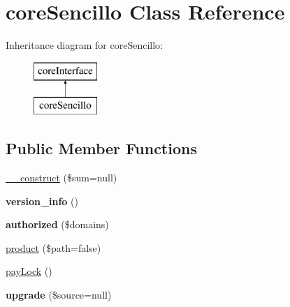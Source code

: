 \hypertarget{classcore_sencillo}{\section{core\-Sencillo Class Reference}
\label{classcore_sencillo}
}
Inheritance diagram for core\-Sencillo\-:\begin{figure}[H]
\begin{center}
\leavevmode
\includegraphics[height=2.000000cm]{classcore_sencillo}
\end{center}
\end{figure}
\subsection*{Public Member Functions}
\begin{DoxyCompactItemize}
\item 
\hyperlink{classcore_sencillo_a4fd5742704d00ae15f527894bcd8cfb9}{\-\_\-\-\_\-construct} (\$sum=null)
\item 
\hypertarget{classcore_sencillo_a7664184e15f00825b54ecf378cd4174f}{{\bfseries version\-\_\-info} ()}\label{classcore_sencillo_a7664184e15f00825b54ecf378cd4174f}

\item 
\hypertarget{classcore_sencillo_a2c7c8f0c4ae866f7c7f9956739d39696}{{\bfseries authorized} (\$domains)}\label{classcore_sencillo_a2c7c8f0c4ae866f7c7f9956739d39696}

\item 
\hyperlink{classcore_sencillo_a62e12d2cf1dbc3c01d867a76d26adf65}{product} (\$path=false)
\item 
\hyperlink{classcore_sencillo_af4cf8181fcda31ba0ce060121795c5dc}{pay\-Lock} ()
\item 
\hypertarget{classcore_sencillo_af357eccac1f8e7e9df4c1491a92bd0f1}{{\bfseries upgrade} (\$source=null)}\label{classcore_sencillo_af357eccac1f8e7e9df4c1491a92bd0f1}

\end{DoxyCompactItemize}
